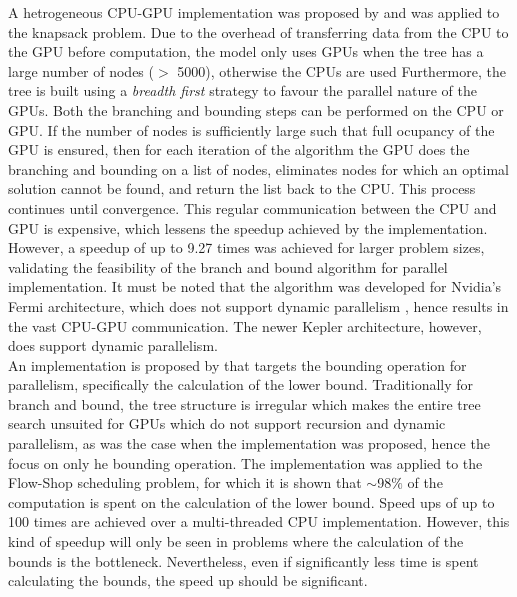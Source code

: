 \documentclass[10pt,twocolumn]{witseiepaper}
\begin{document}
A hetrogeneous CPU-GPU implementation was proposed by \cite{bouk:2012} and was applied to the knapsack 
problem. Due to the overhead of transferring data from the CPU to the GPU before computation, the model only 
uses GPUs when the tree has a large number of nodes ($>$ 5000), otherwise the CPUs are used Furthermore, the 
tree is built using a \textit{breadth first} strategy to favour the parallel nature of the GPUs. Both the
branching and bounding steps can be performed on the CPU or GPU. If the number of nodes is sufficiently large
such that full ocupancy of the GPU is ensured, then for each iteration of the algorithm the GPU does the
branching and bounding on a list of nodes, eliminates nodes for which an optimal solution cannot be found, and
return the list back to the CPU. This process continues until convergence. This regular communication between
the CPU and GPU is expensive, which lessens the speedup achieved by the implementation. However, a speedup of 
up to 9.27 times was achieved for larger problem sizes, validating the feasibility of the branch and bound 
algorithm for parallel implementation. It must be noted that the algorithm was developed for Nvidia's Fermi
architecture, which does not support dynamic parallelism \cite{nvidia:2012}, hence results in the vast CPU-GPU 
communication. The newer Kepler architecture, however, does support dynamic parallelism. \\
An implementation is proposed by \cite{melab:2012} that targets the bounding operation for parallelism,
specifically the calculation of the lower bound. Traditionally for branch and bound, the tree structure is 
irregular which makes the entire tree search unsuited for GPUs which do not support recursion and dynamic 
parallelism, as was the case when the implementation was proposed, hence the focus on only he bounding 
operation. The implementation was applied to the Flow-Shop scheduling problem, for which it is shown that
$\mathit{\sim}$98$\%$ of the computation is spent on the calculation of the lower bound. Speed ups of up to
100 times are achieved over a multi-threaded CPU implementation. However, this kind of speedup will only
be seen in problems where the calculation of the bounds is the bottleneck. Nevertheless, even if significantly
less time is spent calculating the bounds, the speed up should be significant.









\end{document}

